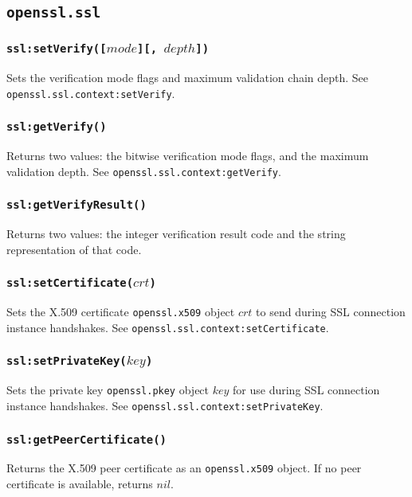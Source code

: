 \documentclass[11pt, oneside]{memoir}
\newcommand*{\fn}[1]{\texttt{#1}\xspace}
\newcommand*{\module}[1]{\texttt{#1}\xspace}
\newcounter{toccols}
\newenvironment{Module}[1]{
	\subsection{\texttt{#1}}
	\addtocontents{toc}{
		\protect\begin{multicols}{\value{toccols}}
	}
}{
	\addtocontents{toc}{\protect\end{multicols}}
}
\begin{document}
\begin{Module}{openssl.ssl}
\subsubsection[\fn{ssl:setVerify}]{\fn{ssl:setVerify([$mode$][, $depth$])}}

Sets the verification mode flags and maximum validation chain depth.
See \fn{openssl.ssl.context:setVerify}.

\subsubsection[\fn{ssl:getVerify}]{\fn{ssl:getVerify()}}

Returns two values: the bitwise verification mode flags, and the maximum validation depth.
See \fn{openssl.ssl.context:getVerify}.

\subsubsection[\fn{ssl:getVerifyResult}]{\fn{ssl:getVerifyResult()}}

Returns two values: the integer verification result code and the string representation of that code.

\subsubsection[\fn{ssl:setCertificate}]{\fn{ssl:setCertificate($crt$)}}

Sets the X.509 certificate \module{openssl.x509} object $crt$ to send during SSL connection instance handshakes.
See \fn{openssl.ssl.context:setCertificate}.

\subsubsection[\fn{ssl:setPrivateKey}]{\fn{ssl:setPrivateKey($key$)}}

Sets the private key \module{openssl.pkey} object $key$ for use during SSL connection instance handshakes.
See \fn{openssl.ssl.context:setPrivateKey}.

\subsubsection[\fn{ssl:getPeerCertificate}]{\fn{ssl:getPeerCertificate()}}

Returns the X.509 peer certificate as an \module{openssl.x509} object. If no peer certificate is available, returns $nil$.


\end{Module}
\end{document}
